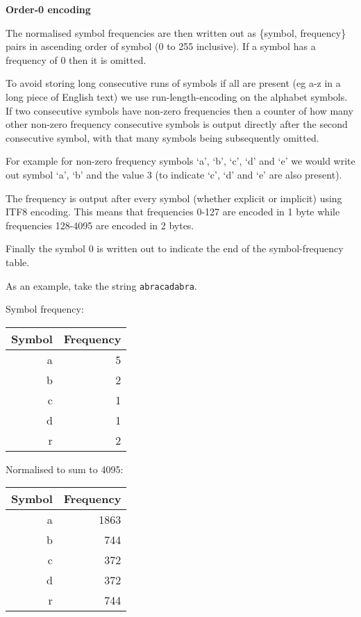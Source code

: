 \documentclass[a4paper]{article}
\begin{document}
\textbf{Order-0 encoding}

The normalised symbol frequencies are then written out as \{symbol,
frequency\} pairs in ascending order of symbol (0 to 255 inclusive).
If a symbol has a frequency of 0 then it is omitted.

To avoid storing long consecutive runs of symbols if all are present
(eg a-z in a long piece of English text) we use run-length-encoding on
the alphabet symbols.  If two consecutive symbols have non-zero
frequencies then a counter of how many other non-zero frequency
consecutive symbols is output directly after the second consecutive
symbol, with that many symbols being subsequently omitted. 

For example for non-zero frequency symbols `a', `b', `c', `d' and `e'
we would write out symbol `a', `b' and the value 3 (to indicate `c',
`d' and `e' are also present).

The frequency is output after every symbol (whether explicit or
implicit) using ITF8 encoding. This means that frequencies 0-127 are
encoded in 1 byte while frequencies 128-4095 are encoded in 2 bytes.

Finally the symbol 0 is written out to indicate the end of the
symbol-frequency table.

As an example, take the string \texttt{abracadabra}.

\begin{minipage}[t]{0.5\textwidth}
Symbol frequency:
\\[8pt]
\begin{tabular}{ |r|r| }
\hline
Symbol & Frequency\\
\hline
a & 5 \\
b & 2 \\
c & 1 \\
d & 1 \\
r & 2 \\
\hline
\end{tabular}
\end{minipage}
\begin{minipage}[t]{0.5\textwidth}
Normalised to sum to 4095:
\\[8pt]
\begin{tabular}{ |r|r|}
\hline
Symbol & Frequency\\
\hline
a & 1863 \\
b &  744 \\
c &  372 \\
d &  372 \\
r &  744 \\
\hline
\end{tabular}
\end{minipage}
\end{document}
